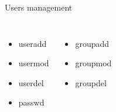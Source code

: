 \begin{frame}[fragile]{Users management}
    \begin{columns}
        \begin{itemize} 
          \item useradd
          \item usermod
          \item userdel
          \item passwd
        \end{itemize}

        \begin{itemize} 
          \item groupadd
          \item groupmod
          \item groupdel
        \end{itemize}
    \end{columns}
\end{frame}
